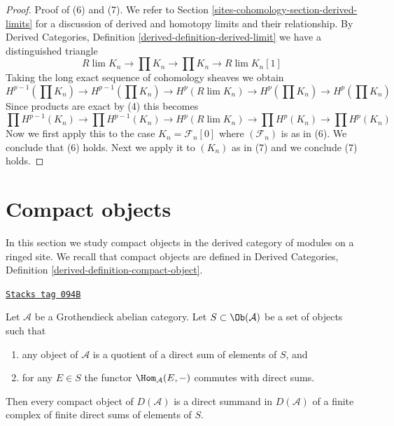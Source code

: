 \begin{proof}
\medskip\noindent
Proof of (6) and (7). We refer to Section \ref{sites-cohomology-section-derived-limits}
for a discussion of derived and homotopy limits and their relationship.
By Derived Categories, Definition \ref{derived-definition-derived-limit}
we have a distinguished
triangle
$$
R\lim K_n \to \prod K_n \to \prod K_n \to R\lim K_n[1]
$$
Taking the long exact sequence of cohomology sheaves we obtain
$$
H^{p - 1}(\prod K_n) \to H^{p - 1}(\prod K_n) \to
H^p(R\lim K_n) \to H^p(\prod K_n) \to H^p(\prod K_n)
$$
Since products are exact by (4) this becomes
$$
\prod H^{p - 1}(K_n) \to \prod H^{p - 1}(K_n) \to
H^p(R\lim K_n) \to \prod H^p(K_n) \to \prod H^p(K_n)
$$
Now we first apply this to the case $K_n = \mathcal{F}_n[0]$
where $(\mathcal{F}_n)$ is as in (6). We conclude that (6) holds.
Next we apply it to $(K_n)$ as in (7) and we conclude (7) holds.
\end{proof}

\section{Compact objects}
\label{sites-cohomology-section-compact}
In this section we study compact objects in the derived category of modules
on a ringed site. We recall that compact objects are defined in
Derived Categories, Definition \ref{derived-definition-compact-object}.

\begin{lemma}
\label{sites-cohomology-lemma-compact-in-terms-of-generators}
\href{https://stacks.math.columbia.edu/tag/094B}{\texttt{Stacks tag 094B}}

Let $\mathcal{A}$ be a Grothendieck abelian category. Let
$S \subset \Ob(\mathcal{A})$ be a set of objects such that
\begin{enumerate}
\item any object of $\mathcal{A}$ is a quotient of a direct sum
of elements of $S$, and
\item for any $E \in S$ the functor $\Hom_\mathcal{A}(E, -)$
commutes with direct sums.
\end{enumerate}
Then every compact object of $D(\mathcal{A})$ is a direct summand
in $D(\mathcal{A})$ of a finite complex of finite direct sums of
elements of $S$.
\end{lemma}


